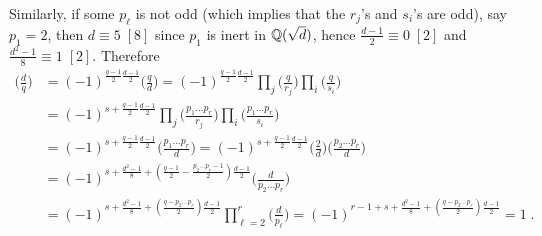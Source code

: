 \documentclass[11pt]{article}
\begin{document}
Similarly, if some $p_\ell$ is not odd (which implies that the $r_j$'s
and $s_i$'s are odd), say $p_1=2$, then $d\equiv 5\; [8]$ since $p_1$
is inert in ${\mathbb Q}(\sqrt{d})$, hence $\frac{d-1}2\equiv 0\;[2]$ and
$\frac{d^2-1}8\equiv 1\;[2]$. Therefore
\begin{align*}
\big(\frac{d}{q}\big)&=(-1)^{\frac{q-1}2\frac{d-1}2}
\big(\frac{q}{d}\big)=(-1)^{\frac{q-1}2\frac{d-1}2}
\prod_{j}\big(\frac{q}{r_j}\big)\prod_{i}
\big(\frac{q}{s_i}\big)\nonumber\\ &=(-1)^{s+\frac{q-1}2\frac{d-1}2}
\prod_{j}\big(\frac{p_1\dots p_r}{r_j}\big)\prod_{i}
\big(\frac{p_1\dots p_r}{s_i}\big)\nonumber\\ &=(-1)^{s+\frac{q-1}2\frac{d-1}2}
\big(\frac{p_1\dots p_r}{d}\big)=(-1)^{s+\frac{q-1}2\frac{d-1}2}
\big(\frac{2}{d}\big)\big(\frac{p_2\dots p_r}{d}\big)\\ &=
(-1)^{s+\frac{d^2-1}{8}+(\frac{q-1}2-\frac{p_2\dots p_r-1}2)\frac{d-1}2}
\big(\frac{d}{p_2\dots p_r}\big)\nonumber\\&=
(-1)^{s+\frac{d^2-1}{8}+(\frac{q-p_2\dots p_r}2)\frac{d-1}2}
\prod_{\ell=2}^r\big(\frac{d}{p_\ell}\big)=
(-1)^{r-1+s+\frac{d^2-1}{8}+(\frac{q-p_2\dots p_r}2)\frac{d-1}2}=1\;.
\end{align*}
\end{document}
